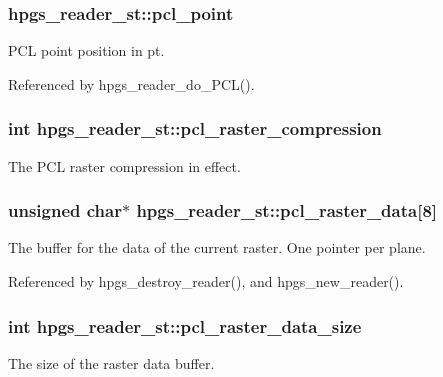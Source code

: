 \subsubsection[{pcl\_\-point}]{ {\bf hpgs\_\-reader\_\-st::pcl\_\-point}}\label{structhpgs__reader__st_ab442193f453cc9e03b4bda37d7b9da0c}
PCL point position in pt. 

Referenced by hpgs\_\-reader\_\-do\_\-PCL().

\subsubsection[{pcl\_\-raster\_\-compression}]{\setlength{\rightskip}{0pt plus 5cm}int {\bf hpgs\_\-reader\_\-st::pcl\_\-raster\_\-compression}}\label{structhpgs__reader__st_a7f9f6a2957dd7482c31a979ebe4587fb}
The PCL raster compression in effect. 
\subsubsection[{pcl\_\-raster\_\-data}]{\setlength{\rightskip}{0pt plus 5cm}unsigned char$\ast$ {\bf hpgs\_\-reader\_\-st::pcl\_\-raster\_\-data}[8]}\label{structhpgs__reader__st_ab11a72c0a62466ebd86d30726c37d8ba}
The buffer for the data of the current raster. One pointer per plane. 

Referenced by hpgs\_\-destroy\_\-reader(), and hpgs\_\-new\_\-reader().

\subsubsection[{pcl\_\-raster\_\-data\_\-size}]{\setlength{\rightskip}{0pt plus 5cm}int {\bf hpgs\_\-reader\_\-st::pcl\_\-raster\_\-data\_\-size}}\label{structhpgs__reader__st_a6d466db42e933a5951a9f1eb32d7cb02}
The size of the raster data buffer. 
